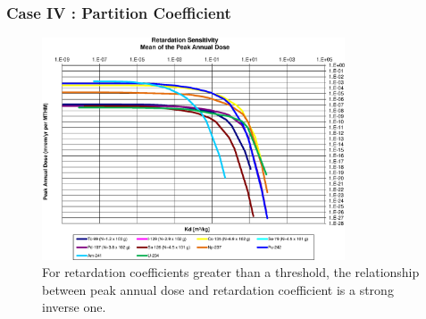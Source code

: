 \begin{frame}[c]
  \frametitle{Case IV : Partition Coefficient}

\begin{figure}[ht]
\centering
\includegraphics[width=0.8\textwidth]{Sorption/Retardation_Summary_kd.eps}
\caption{
For retardation coefficients greater than a threshold, the 
relationship between peak annual dose and retardation coefficient is a strong 
inverse one. }
\label{fig:KdSum}
\end{figure}
\end{frame}

